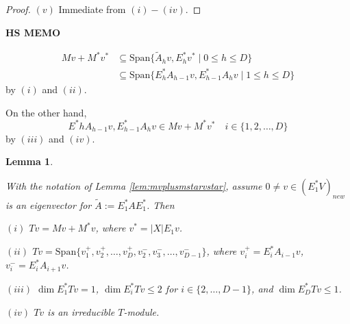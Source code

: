 \documentclass[
]{book}
\newtheorem{lemma}{Lemma}[chapter]
\theoremstyle{definition}
\theoremstyle{definition}
\theoremstyle{definition}
\theoremstyle{definition}
\theoremstyle{remark}
\begin{document}
\begin{proof}
\((v)\) Immediate from \((i)-(iv)\).

\end{proof}

\textbf{HS MEMO}

\begin{align}
Mv + M^*v^* & \subseteq \mathrm{Span}\{\tilde{A}_hv, E^*_hv^*\mid 0\leq h\leq D\}\\
& \subseteq \mathrm{Span}\{E^*_hA_{h-1}v, E^*_{h-1}A_hv\mid 1\leq h\leq D\}
\end{align}
by \((i)\) and \((ii)\).

On the other hand,
\[E^*hA_{h-1}v, E^*_{h-1}A_hv\in Mv + M^*v^* \quad i\in \{1, 2, \ldots, D\}\]
by \((iii)\) and \((iv)\).

\begin{lemma}
\protect\hypertarget{lem:tv}{}\label{lem:tv}

With the notation of Lemma \ref{lem:mvplusmstarvstar}, assume \(0\neq v\in (E^*_1V)_{new}\) is an eigenvector for \(\tilde{A}:=E^*_1AE^*_1\). Then

\((i)\) \(Tv = Mv + M^*v\), where \(v^* = |X|E_1v\).

\((ii)\) \(Tv = \mathrm{Span}\{v^+_1, v^+_2, \ldots, v^+_D, v^-_2, v^-_3, \ldots, v^-_{D-1}\}\), where \(v^+_i = E^*_iA_{i-1}v\), \(v^-_i = E^*_iA_{i+1}v\).

\((iii)\) \(\dim E^*_1Tv = 1\), \(\dim E^*_iTv \leq 2\) for \(i\in \{2, \ldots, D-1\}\), and \(\dim E^*_DTv \leq 1\).

\((iv)\) \(Tv\) is an irreducible \(T\)-module.

\end{lemma}
\end{document}
